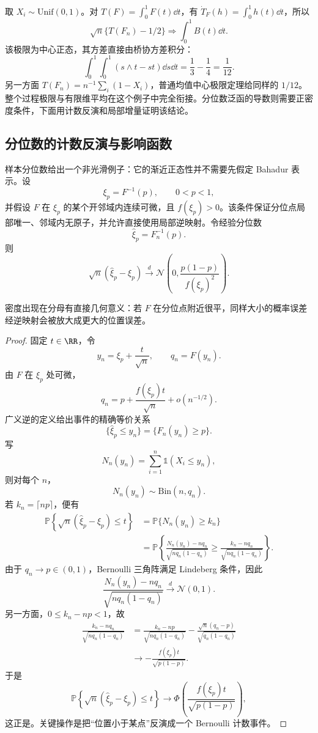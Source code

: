\begin{exbox}[均匀经验过程的积分泛函]
取 $X_i\sim\mathrm{Unif}(0,1)$。对 $T(F)=\int_0^1F(t)\dd t$，有 $\dot T_F(h)=\int_0^1h(t)\dd t$，所以
\[
 \sqrt n\{T(F_n)-1/2\}\Rightarrow\int_0^1B(t)\dd t.
\]
该极限为中心正态，其方差直接由桥协方差积分：
\[
 \int_0^1\!\int_0^1(s\wedge t-st)\dd s\dd t=\frac13-\frac14=\frac1{12}.
\]
另一方面 $T(F_n)=n^{-1}\sum_i(1-X_i)$，普通均值中心极限定理给同样的 $1/12$。整个过程极限与有限维平均在这个例子中完全衔接。分位数泛函的导数则需要正密度条件，下面用计数反演和局部增量证明该结论。
\end{exbox}


\subsection{分位数的计数反演与影响函数}
\begin{theorem}[样本分位数的渐近正态性]
样本分位数给出一个非光滑例子：它的渐近正态性并不需要先假定 Bahadur 表示。设
\[
 \xi_p=F^{-1}(p),\qquad 0<p<1,
\]
并假设 $F$ 在 $\xi_p$ 的某个开邻域内连续可微，且 $f(\xi_p)>0$。该条件保证分位点局部唯一、邻域内无原子，并允许直接使用局部逆映射。令经验分位数
\[
 \widehat\xi_p=F_n^{-1}(p).
\]
则
\begin{equation}\label{eq:math-stat-quantile-asymptotic-normal}
 \sqrt n(\widehat\xi_p-\xi_p)
 \xrightarrow{d}
 \mathcal N\!\left(0,
 \frac{p(1-p)}{f(\xi_p)^2}\right).
\end{equation}
\end{theorem}
密度出现在分母有直接几何意义：若 $F$ 在分位点附近很平，同样大小的概率误差经逆映射会被放大成更大的位置误差。

\begin{proof}
固定 $t\in\RR$，令
\[
 y_n=\xi_p+\frac{t}{\sqrt n},
 \qquad
 q_n=F(y_n).
\]
由 $F$ 在 $\xi_p$ 处可微，
\[
 q_n
 =p+\frac{f(\xi_p)t}{\sqrt n}
 +o(n^{-1/2}).
\]
广义逆的定义给出事件的精确等价关系
\[
 \{\widehat\xi_p\le y_n\}
 =\{F_n(y_n)\ge p\}.
\]
写
\[
 N_n(y_n)=\sum_{i=1}^n\mathds{1}(X_i\le y_n),
\]
则对每个 $n$，
\[
 N_n(y_n)\sim\mathrm{Bin}(n,q_n).
\]
若 $k_n=\lceil np\rceil$，便有
\begin{align*}
 \mathbb P\!\left\{
 \sqrt n(\widehat\xi_p-\xi_p)\le t
 \right\}
 &=\mathbb P\{N_n(y_n)\ge k_n\}\\
 &=\mathbb P\!\left\{
 \frac{N_n(y_n)-nq_n}{\sqrt{nq_n(1-q_n)}}
 \ge
 \frac{k_n-nq_n}{\sqrt{nq_n(1-q_n)}}
 \right\}.
\end{align*}
由于 $q_n\to p\in(0,1)$，Bernoulli 三角阵满足 Lindeberg 条件，因此
\[
 \frac{N_n(y_n)-nq_n}{\sqrt{nq_n(1-q_n)}}
 \xrightarrow{d}\mathcal N(0,1).
\]
另一方面，$0\le k_n-np<1$，故
\begin{align*}
 \frac{k_n-nq_n}{\sqrt{nq_n(1-q_n)}}
 &=\frac{k_n-np}{\sqrt{nq_n(1-q_n)}}
 -\frac{\sqrt n(q_n-p)}{\sqrt{q_n(1-q_n)}}\\
 &\longrightarrow
 -\frac{f(\xi_p)t}{\sqrt{p(1-p)}}.
\end{align*}
于是
\[
 \mathbb P\!\left\{
 \sqrt n(\widehat\xi_p-\xi_p)\le t
 \right\}
 \longrightarrow
 \Phi\!\left(
 \frac{f(\xi_p)t}{\sqrt{p(1-p)}}
 \right),
\]
这正是。关键操作是把“位置小于某点”反演成一个 Bernoulli 计数事件。

\end{proof}

